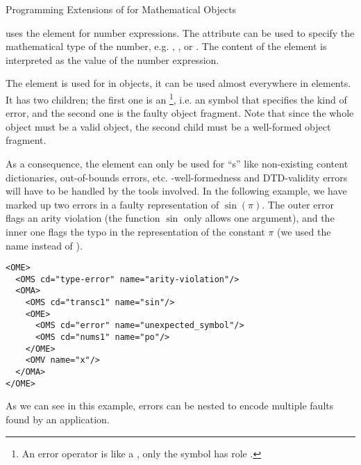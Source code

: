 \begin{omgroup}[id=mobj,short=Mathematical Objects]
\begin{omgroup}[id=om.error]{Programming Extensions of for Mathematical Objects}
\begin{definition}
  \cmathml uses the  element for number expressions. The attribute
   can be used to specify the mathematical type of the
  number, e.g. {}, {}, or {}. The content
  of the  element is interpreted as the value of the number
  expression.
\end{definition}

\begin{definition}[id=ome.def]
  The {} element is used for {} in
  {\openmath} objects, it can be used almost everywhere in {\openmath} elements. It has
  two children; the first one is an {}\footnote{An error operator
    is like a {}, only the symbol has role
    .}, i.e. an {\openmath} symbol that specifies the kind
  of error, and the second one is the faulty {\openmath} object fragment. Note that since
  the whole object must be a valid {\openmath} object, the second child must be a
  well-formed {\openmath} object fragment.
\end{definition}
As a consequence, the  element can only be used for
``{s}'' like non-existing content dictionaries, out-of-bounds
errors, etc.  {\xml}-well-formedness and DTD-validity errors will have to be handled by
the {\xml} tools involved. In the following example, we have marked up two errors in a
faulty representation of $\sin(\pi)$.  The outer error flags an arity violation (the
function $\sin$ only allows one argument), and the inner one flags the typo in the
representation of the constant $\pi$ (we used the name {} instead of
{}).

\begin{lstlisting}[label=ome,language=OpenMath,numbers=none,index={OME}]
<OME>
  <OMS cd="type-error" name="arity-violation"/>
  <OMA>
    <OMS cd="transc1" name="sin"/>
    <OME>
      <OMS cd="error" name="unexpected_symbol"/>
      <OMS cd="nums1" name="po"/>
    </OME>
    <OMV name="x"/>
  </OMA>
</OME>
\end{lstlisting}
  As we can see in this example, errors can be nested to encode multiple faults found by
  an {\openmath} application.

\end{omgroup}






\end{omgroup}
